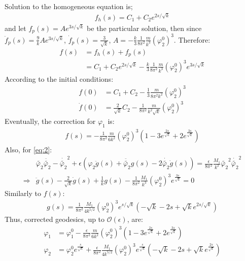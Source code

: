 \documentclass[fleqn]{article}
\begin{document}
Solution to the homogeneous equation is;
\begin{align}
    f_{h} (s) = C_{1} + C_{2} e^{2s/\sqrt{k}} 
\end{align}
and let $f_{p}(s) = A e^{3s/\sqrt{k}}$ be the particular solution, then since $\ddot{f}_{p} (s) = \frac{9}{k}A e^{3s /\sqrt{k}}$, $\dot{f}_{p} (s) = \frac{3}{\sqrt{k}}$, $A = -\frac{k}{3} \frac{1}{8\pi^{2}}\frac{m}{k^{3}} (\varphi_{2}^{0})^{3}$. Therefore:
\begin{align}
    f(s) &= f_{h}(s) + f_{p}(s) \nonumber \\
    &= C_{1} + C_{2} e^{2s/\sqrt{k}} - \frac{k}{3}\frac{1}{8\pi^{2}}\frac{m}{k^{3}}(\varphi_{2}^{0})^{3} e^{3s/\sqrt{k}}
\end{align}
According to the initial conditions:
\begin{align}
    f(0) &= C_{1} + C_{2} - \frac{1}{3}\frac{m}{8\pi^{2}k^{2}}(\varphi_{2}^{0})^{3} \\
    \dot{f}(0) &= \frac{2}{\sqrt{k}}C_{2} -  \frac{1}{8\pi^{2}}\frac{m}{k^{2}\sqrt{k}}(\varphi_{2}^{0})^{3}
\end{align}
Eventually, the correction for $\varphi_{1}$ is:
\begin{align}
    f(s) = -\frac{1}{8\pi^{2}}\frac{m}{6k^{2}}(\varphi_{2}^{0})^{3}(1-3e^{\frac{2s}{\sqrt{k}}} + 2e^{\frac{3s}{\sqrt{k}}})
\end{align}
Also, for \ref{eq:2}:
\begin{align}
    &\tilde{\varphi_{2}}\ddot{\tilde{\varphi_{2}}} -\dot{\tilde{\varphi_{2}}}^{2} + \epsilon(\varphi_{2}\ddot{g}(s) + \ddot{\tilde{\varphi_{2}}} g(s) - 2\dot{\tilde{\varphi_{2}}}\dot{g}(s)) = \frac{\epsilon}{8\pi^{2}}\frac{M_1}{k^2} \tilde{\varphi_{2}}^2 \dot{\tilde{\varphi_{2}}}^2 \\
    \Rightarrow & \ddot{g}(s) - \frac{2}{\sqrt{k}} \dot{g}(s) +\frac{1}{k}g(s) - \frac{1}{8\pi^{2}}\frac{M_{1}}{k^3} (\varphi_{2}^{0})^{3} e^{\frac{3s}{\sqrt{k}} }= 0
\end{align}
Similarly to $f(s)$:
\begin{align}
    g(s) = \frac{1}{8\pi^{2}} \frac{M_{1}}{4k^{5/2}}(\varphi_{2}^{0})^{3}e^{s/\sqrt{k}} (-\sqrt{k} - 2s +\sqrt{k} e^{2s/\sqrt{k}})
\end{align}
Thus, corrected geodesics, up to $\mathcal{O}(\epsilon)$, are:
\begin{align}[left=\empheqlbrace]
    \varphi_{1} &= \varphi_{1}^{0} - \frac{\epsilon}{8\pi^2} \frac{m}{6k^{2}} (\varphi_{2}^{0})^{3} (1-3e^{\frac{2s}{\sqrt{k}}} + 2e^{\frac{3s}{\sqrt{k}}}) \\
    \varphi_{2} &= \varphi_{2}^{0} e^{\frac{s}{\sqrt{k}}} + \frac{\epsilon}{8\pi^{2}}\frac{M_{1}}{4k^{5/2}} (\varphi_{2}^{0})^{3} e^{\frac{s}{\sqrt{k}}} (-\sqrt{k} - 2s + \sqrt{k} e^{\frac{2s}{\sqrt{k}}})
\end{align}
\end{document}
